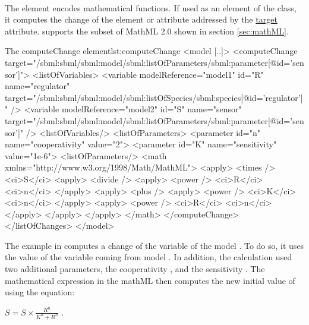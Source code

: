 \paragraph{}
\label{sec:math}

The  element encodes mathematical functions. 
If used as an element of the  class, it computes the change of the element or attribute addressed by the \hyperref[sec:target]{target} attribute.
\LoneVtwo supports the subset of MathML 2.0 shown in section \ref{sec:mathML}.

%
\begin{myXmlLst}{The computeChange element}{lst:computeChange}
<model [..]>
    <computeChange target="/sbml:sbml/sbml:model/sbml:listOfParameters/sbml:parameter[@id='sensor']">
      <listOfVariables>
        <variable modelReference="model1" id="R" name="regulator" 
                  target="/sbml:sbml/sbml:model/sbml:listOfSpecies/sbml:species[@id='regulator']" />
        <variable modelReference="model2" id="S" name="sensor"
                  target="/sbml:sbml/sbml:model/sbml:listOfParameters/sbml:parameter[@id='sensor']" />
      <listOfVariables/>
      <listOfParameters>
        <parameter id="n" name="cooperativity" value="2">
        <parameter id="K" name="sensitivity" value="1e-6">
      <listOfParameters/>
      <math  xmlns="http://www.w3.org/1998/Math/MathML">
        <apply>
          <times />
          <ci>S</ci>
          <apply>
            <divide />
            <apply>
              <power />
              <ci>R</ci>
              <ci>n</ci>
            </apply>
            <apply>
              <plus />
              <apply>
                <power />
                <ci>K</ci>
                <ci>n</ci>
              </apply>
              <apply>
                <power />
                <ci>R</ci>
                <ci>n</ci>
              </apply>
            </apply> 
          </apply>
        </math>
    </computeChange>
  </listOfChanges>
</model>
\end{myXmlLst}
%

The example in  computes a change of the variable  of the model . To do so, it uses the value of the variable  coming from model . In addition, the calculation used two additional parameters, the cooperativity , and the sensitivity .
The mathematical expression in the mathML then computes the new initial value of  using the equation:

\begin{math}
S =  S \times \frac{R^{n}}{K^{n}+R^{n}}
\end{math}
.


